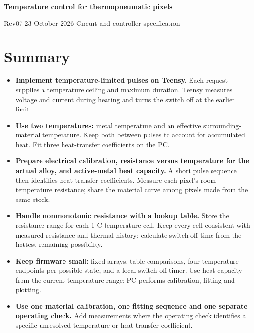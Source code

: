 \documentclass[11pt,letterpaper]{article}
\begin{document}
\begin{center}
{\LARGE\bfseries Temperature control for thermopneumatic pixels\par}
\vspace{0.45em}
{\small Rev07 \textperiodcentered{} 23 October 2026 \textperiodcentered{} Circuit and controller specification\par}
\end{center}
\vspace{0.25em}


\section*{Summary}

\begin{itemize}
\item \textbf{Implement temperature-limited pulses on Teensy.} Each request supplies a temperature ceiling and maximum duration. Teensy measures voltage and current during heating and turns the switch off at the earlier limit.
\item \textbf{Use two temperatures:} metal temperature and an effective surrounding-material temperature. Keep both between pulses to account for accumulated heat. Fit three heat-transfer coefficients on the PC.
\item \textbf{Prepare electrical calibration, resistance versus temperature for the actual alloy, and active-metal heat capacity.} A short pulse sequence then identifies heat-transfer coefficients. Measure each pixel's room-temperature resistance; share the material curve among pixels made from the same stock.
\item \textbf{Handle nonmonotonic resistance with a lookup table.} Store the resistance range for each 1 \textdegree{}C temperature cell. Keep every cell consistent with measured resistance and thermal history; calculate switch-off time from the hottest remaining possibility.
\item \textbf{Keep firmware small:} fixed arrays, table comparisons, four temperature endpoints per possible state, and a local switch-off timer. Use heat capacity from the current temperature range; PC performs calibration, fitting and plotting.
\item \textbf{Use one material calibration, one fitting sequence and one separate operating check.} Add measurements where the operating check identifies a specific unresolved temperature or heat-transfer coefficient.
\end{itemize}
\end{document}
